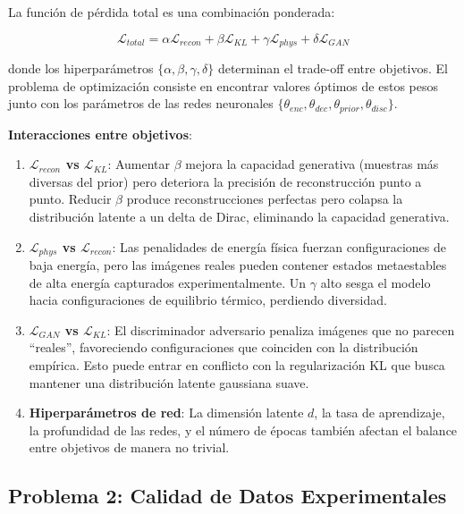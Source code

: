 \documentclass[12pt]{article}
\begin{document}
La función de pérdida total es una combinación ponderada:

\begin{equation}
\mathcal{L}_{total} = \alpha \mathcal{L}_{recon} + \beta \mathcal{L}_{KL} + \gamma \mathcal{L}_{phys} + \delta \mathcal{L}_{GAN}
\end{equation}

donde los hiperparámetros $\{\alpha, \beta, \gamma, \delta\}$ determinan el trade-off entre objetivos. El problema de optimización consiste en encontrar valores óptimos de estos pesos junto con los parámetros de las redes neuronales $\{\theta_{enc}, \theta_{dec}, \theta_{prior}, \theta_{disc}\}$.

\textbf{Interacciones entre objetivos}:

\begin{enumerate}
    \item \textbf{$\mathcal{L}_{recon}$ vs $\mathcal{L}_{KL}$}: Aumentar $\beta$ mejora la capacidad generativa (muestras más diversas del prior) pero deteriora la precisión de reconstrucción punto a punto. Reducir $\beta$ produce reconstrucciones perfectas pero colapsa la distribución latente a un delta de Dirac, eliminando la capacidad generativa.

    \item \textbf{$\mathcal{L}_{phys}$ vs $\mathcal{L}_{recon}$}: Las penalidades de energía física fuerzan configuraciones de baja energía, pero las imágenes reales pueden contener estados metaestables de alta energía capturados experimentalmente. Un $\gamma$ alto sesga el modelo hacia configuraciones de equilibrio térmico, perdiendo diversidad.

    \item \textbf{$\mathcal{L}_{GAN}$ vs $\mathcal{L}_{KL}$}: El discriminador adversario penaliza imágenes que no parecen ``reales'', favoreciendo configuraciones que coinciden con la distribución empírica. Esto puede entrar en conflicto con la regularización KL que busca mantener una distribución latente gaussiana suave.

    \item \textbf{Hiperparámetros de red}: La dimensión latente $d$, la tasa de aprendizaje, la profundidad de las redes, y el número de épocas también afectan el balance entre objetivos de manera no trivial.
\end{enumerate}

\subsection{Problema 2: Calidad de Datos Experimentales}
\end{document}
